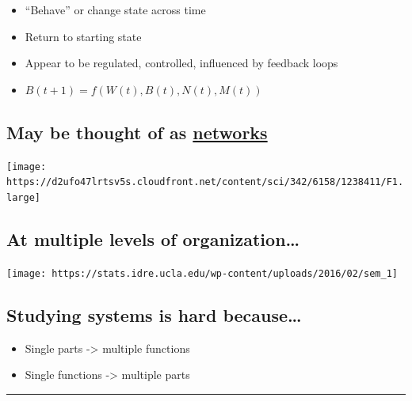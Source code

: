 \documentclass[]{article}
\providecommand{\tightlist}{%
  \setlength{\itemsep}{0pt}\setlength{\parskip}{0pt}}
\begin{document}
\begin{itemize}
\tightlist
\item
  ``Behave'' or change state across time
\item
  Return to starting state
\item
  Appear to be regulated, controlled, influenced by feedback loops
\item
  \(B(t+1) = f(W(t), B(t), N(t), M(t))\)
\end{itemize}

\hypertarget{may-be-thought-of-as-networks}{%
\subsection{\texorpdfstring{May be thought of as
\href{https://en.wikipedia.org/wiki/Network_science}{networks}}{May be thought of as networks}}\label{may-be-thought-of-as-networks}}

\begin{center}\texttt{[image: https://d2ufo47lrtsv5s.cloudfront.net/content/sci/342/6158/1238411/F1.large]} \end{center}

\hypertarget{at-multiple-levels-of-organization}{%
\subsection{At multiple levels of
organization\ldots{}}\label{at-multiple-levels-of-organization}}

\begin{center}\texttt{[image: https://stats.idre.ucla.edu/wp-content/uploads/2016/02/sem\_1]} \end{center}

\hypertarget{studying-systems-is-hard-because}{%
\subsection{Studying systems is hard
because\ldots{}}\label{studying-systems-is-hard-because}}

\begin{itemize}
\tightlist
\item
  Single parts -\textgreater{} multiple functions
\item
  Single functions -\textgreater{} multiple parts
\end{itemize}

\begin{center}\rule{0.5\linewidth}{\linethickness}\end{center}
\end{document}

